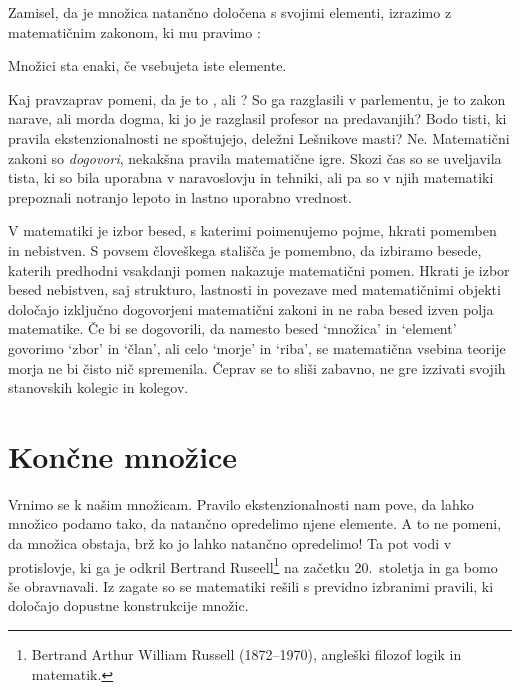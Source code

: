 Zamisel, da je množica natančno določena s svojimi elementi, izrazimo z matematičnim
zakonom, ki mu pravimo :

\begin{pravilo}
  Množici sta enaki, če vsebujeta iste elemente.
\end{pravilo}

Kaj pravzaprav pomeni, da je to ,  ali ? So ga
razglasili v parlementu, je to zakon narave, ali morda dogma, ki jo je razglasil profesor
na predavanjih? Bodo tisti, ki pravila ekstenzionalnosti ne spoštujejo, deležni Lešnikove
masti? Ne. Matematični zakoni so \emph{dogovori}, nekakšna pravila matematične igre. Skozi
čas so se uveljavila tista, ki so bila uporabna v naravoslovju in tehniki, ali pa so v njih
matematiki prepoznali notranjo lepoto in lastno uporabno vrednost.

V matematiki je izbor besed, s katerimi poimenujemo pojme, hkrati pomemben in nebistven.
%
S povsem človeškega stališča je pomembno, da izbiramo besede, katerih predhodni vsakdanji pomen nakazuje matematični pomen.
%
Hkrati je izbor besed nebistven, saj strukturo, lastnosti in povezave med
matematičnimi objekti določajo izključno dogovorjeni matematični zakoni in ne raba besed izven polja matematike.
%
Če bi se dogovorili, da namesto besed  `množica' in `element' govorimo `zbor' in `član', ali celo `morje' in `riba', se matematična vsebina teorije morja ne bi čisto nič spremenila.
%
Čeprav se to sliši zabavno, ne gre izzivati svojih stanovskih kolegic in kolegov.

\section{Končne množice}
\label{sec:koncne-mnozice}

Vrnimo se k našim množicam. Pravilo ekstenzionalnosti nam pove, da lahko množico podamo
tako, da natančno opredelimo njene elemente. A to ne pomeni, da množica obstaja, brž ko jo
lahko natančno opredelimo! Ta  pot vodi v protislovje, ki ga je odkril Bertrand Ruseell\footnote{Bertrand Arthur William Russell (1872--1970), angleški filozof logik in matematik.} na začetku 20.~stoletja in ga bomo še obravnavali.
Iz zagate so se matematiki rešili s previdno izbranimi pravili, ki določajo dopustne konstrukcije množic.

